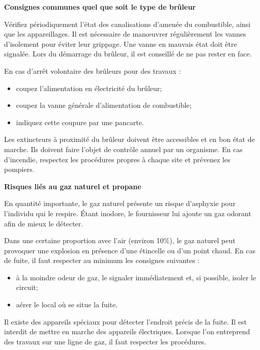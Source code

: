 \textbf{Consignes communes quel que soit le type de brûleur}
\vspace{0.3cm}


Vérifiez périodiquement l’état des canalisations d’amenée du combustible, ainsi que les appareillages.
Il est nécessaire de manœuvrer régulièrement les vannes d’isolement pour éviter leur grippage. Une vanne en mauvais état doit être signalée.
Lors du démarrage du brûleur, il est conseillé de ne pas rester en face.
\vspace{0.3cm}

En cas d’arrêt volontaire des brûleurs pour des travaux :

\begin{itemize}
\item  coupez l’alimentation en électricité du brûleur;
\item  coupez la vanne générale d’alimentation de combustible;
\item  indiquez cette coupure par une pancarte.

\end{itemize}


Les extincteurs à proximité du brûleur doivent être accessibles et en bon état de marche. Ils doivent faire l’objet de contrôle annuel par un organisme.
En cas d’incendie, respectez les procédures propres à chaque site et prévenez les pompiers.


\vspace{0.3cm}
\textbf{Risques liés au gaz naturel et propane}
\vspace{0.3cm}

En quantité importante, le gaz naturel présente un risque d’asphyxie pour l’individu qui le respire. Étant inodore, le fournisseur lui ajoute un gaz odorant afin de mieux le détecter.
\vspace{0.3cm}

Dans une certaine proportion avec l’air (environ 10\%), le gaz naturel peut provoquer une explosion en présence d’une étincelle ou d’un point chaud.
En cas de fuite, il faut respecter au minimum les consignes suivantes :

\begin{itemize}
\item  à la moindre odeur de gaz, le signaler immédiatement et, si possible, isoler le circuit;
\item  aérer le local où se situe la fuite.

\end{itemize}


Il existe des appareils spéciaux pour détecter l’endroit précis de la fuite.
Il est interdit de mettre en marche des appareils électriques.
Lorsque l’on entreprend des travaux sur une ligne de gaz, il faut respecter les procédures.
\vspace{0.3cm}

